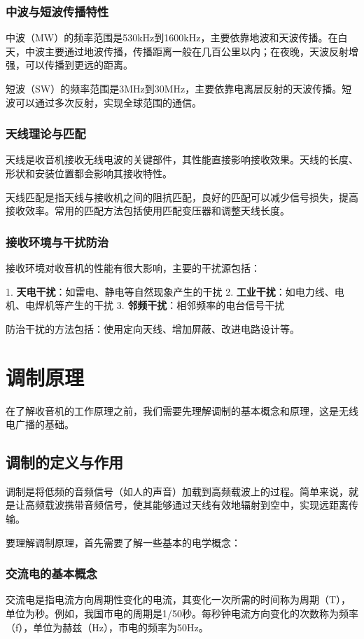 \documentclass[12pt,UTF8]{ctexbook}
\begin{document}
\subsubsection{中波与短波传播特性}

中波（MW）的频率范围是530kHz到1600kHz，主要依靠地波和天波传播。在白天，中波主要通过地波传播，传播距离一般在几百公里以内；在夜晚，天波反射增强，可以传播到更远的距离。

短波（SW）的频率范围是3MHz到30MHz，主要依靠电离层反射的天波传播。短波可以通过多次反射，实现全球范围的通信。

\subsubsection{天线理论与匹配}

天线是收音机接收无线电波的关键部件，其性能直接影响接收效果。天线的长度、形状和安装位置都会影响其接收特性。

天线匹配是指天线与接收机之间的阻抗匹配，良好的匹配可以减少信号损失，提高接收效率。常用的匹配方法包括使用匹配变压器和调整天线长度。

\subsubsection{接收环境与干扰防治}

接收环境对收音机的性能有很大影响，主要的干扰源包括：

1. \textbf{天电干扰}：如雷电、静电等自然现象产生的干扰
2. \textbf{工业干扰}：如电力线、电机、电焊机等产生的干扰
3. \textbf{邻频干扰}：相邻频率的电台信号干扰

防治干扰的方法包括：使用定向天线、增加屏蔽、改进电路设计等。

\section{调制原理}

在了解收音机的工作原理之前，我们需要先理解调制的基本概念和原理，这是无线电广播的基础。

\subsection{调制的定义与作用}
调制是将低频的音频信号（如人的声音）加载到高频载波上的过程。简单来说，就是让高频载波携带音频信号，使其能够通过天线有效地辐射到空中，实现远距离传输。

要理解调制原理，首先需要了解一些基本的电学概念：

\subsubsection{交流电的基本概念}
交流电是指电流方向周期性变化的电流，其变化一次所需的时间称为周期（T），单位为秒。例如，我国市电的周期是1/50秒。每秒钟电流方向变化的次数称为频率（f），单位为赫兹（Hz），市电的频率为50Hz。
\end{document}
